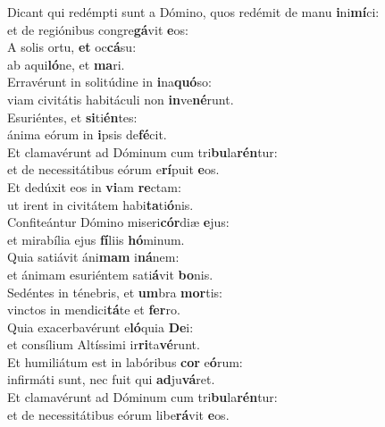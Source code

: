 \evenverse Dicant qui redémpti sunt a Dómino, quos redémit de manu \textbf{i}ni\textbf{mí}ci:~\*\\
\evenverse et de regiónibus congre\textbf{gá}vit \textbf{e}os:\\
\oddverse A solis ortu, \textbf{et} oc\textbf{cá}su:~\*\\
\oddverse ab aqui\textbf{ló}ne, et \textbf{ma}ri.\\
\evenverse Erravérunt in solitúdine in \textbf{i}na\textbf{quó}so:~\*\\
\evenverse viam civitátis habitáculi non \textbf{in}ve\textbf{né}runt.\\
\oddverse Esuriéntes, et \textbf{si}ti\textbf{én}tes:~\*\\
\oddverse ánima eórum in \textbf{i}psis de\textbf{fé}cit.\\
\evenverse Et clamavérunt ad Dóminum cum tri\textbf{bu}la\textbf{rén}tur:~\*\\
\evenverse et de necessitátibus eórum e\textbf{rí}puit \textbf{e}os.\\
\oddverse Et dedúxit eos in \textbf{vi}am \textbf{re}ctam:~\*\\
\oddverse ut irent in civitátem habi\textbf{ta}ti\textbf{ó}nis.\\
\evenverse Confiteántur Dómino miseri\textbf{cór}diæ \textbf{e}jus:~\*\\
\evenverse et mirabília ejus \textbf{fí}liis \textbf{hó}minum.\\
\oddverse Quia satiávit áni\textbf{mam} i\textbf{ná}nem:~\*\\
\oddverse et ánimam esuriéntem sati\textbf{á}vit \textbf{bo}nis.\\
\evenverse Sedéntes in ténebris, et \textbf{um}bra \textbf{mor}tis:~\*\\
\evenverse vinctos in mendici\textbf{tá}te et \textbf{fer}ro.\\
\oddverse Quia exacerbavérunt e\textbf{ló}quia \textbf{De}i:~\*\\
\oddverse et consílium Altíssimi ir\textbf{ri}ta\textbf{vé}runt.\\
\evenverse Et humiliátum est in labóribus \textbf{cor} e\textbf{ó}rum:~\*\\
\evenverse infirmáti sunt, nec fuit qui \textbf{ad}ju\textbf{vá}ret.\\
\oddverse Et clamavérunt ad Dóminum cum tri\textbf{bu}la\textbf{rén}tur:~\*\\
\oddverse et de necessitátibus eórum libe\textbf{rá}vit \textbf{e}os.\\
